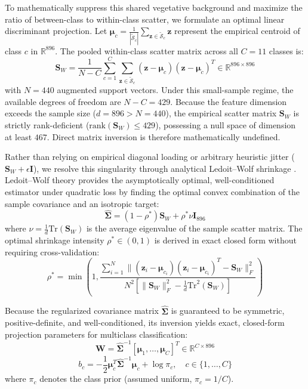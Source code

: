\documentclass[conference]{IEEEtran}
\begin{document}
To mathematically suppress this shared vegetative background and maximize the ratio of between-class to within-class scatter, we formulate an optimal linear discriminant projection. Let $\boldsymbol{\mu}_c = \frac{1}{|\tilde{\mathcal{S}}_c|}\sum_{\mathbf{z} \in \tilde{\mathcal{S}}_c} \mathbf{z}$ represent the empirical centroid of class $c$ in $\mathbb{R}^{896}$. The pooled within-class scatter matrix across all $C=11$ classes is:
\begin{equation}
\mathbf{S}_W = \frac{1}{N - C}\sum_{c=1}^C \sum_{\mathbf{z} \in \tilde{\mathcal{S}}_c} (\mathbf{z} - \boldsymbol{\mu}_c)(\mathbf{z} - \boldsymbol{\mu}_c)^T \in \mathbb{R}^{896 \times 896}
\end{equation}
with $N = 440$ augmented support vectors. Under this small-sample regime, the available degrees of freedom are $N - C = 429$. Because the feature dimension exceeds the sample size ($d = 896 > N = 440$), the empirical scatter matrix $\mathbf{S}_W$ is strictly rank-deficient ($\text{rank}(\mathbf{S}_W) \le 429$), possessing a null space of dimension at least $467$. Direct matrix inversion is therefore mathematically undefined.

Rather than relying on empirical diagonal loading or arbitrary heuristic jitter ($\mathbf{S}_W + \epsilon \mathbf{I}$), we resolve this singularity through analytical Ledoit--Wolf shrinkage \cite{ledoit2004well}. Ledoit--Wolf theory provides the asymptotically optimal, well-conditioned estimator under quadratic loss by finding the optimal convex combination of the sample covariance and an isotropic target:
\begin{equation}
\hat{\mathbf{\Sigma}} = (1 - \rho^*)\mathbf{S}_W + \rho^* \nu \mathbf{I}_{896}
\end{equation}
where $\nu = \frac{1}{d}\text{Tr}(\mathbf{S}_W)$ is the average eigenvalue of the sample scatter matrix. The optimal shrinkage intensity $\rho^* \in (0, 1)$ is derived in exact closed form without requiring cross-validation:
\begin{equation}
\rho^* = \min\left(1, \frac{\sum_{i=1}^N \|(\mathbf{z}_i - \boldsymbol{\mu}_{c_i})(\mathbf{z}_i - \boldsymbol{\mu}_{c_i})^T - \mathbf{S}_W\|_F^2}{N^2 \left[\|\mathbf{S}_W\|_F^2 - \frac{1}{d}\text{Tr}^2(\mathbf{S}_W)\right]}\right)
\end{equation}

Because the regularized covariance matrix $\hat{\mathbf{\Sigma}}$ is guaranteed to be symmetric, positive-definite, and well-conditioned, its inversion yields exact, closed-form projection parameters for multiclass classification:
\begin{equation}
\mathbf{W} = \hat{\mathbf{\Sigma}}^{-1} [\boldsymbol{\mu}_1, \dots, \boldsymbol{\mu}_C]^T \in \mathbb{R}^{C \times 896}
\end{equation}
\begin{equation}
b_c = -\frac{1}{2} \boldsymbol{\mu}_c^T \hat{\mathbf{\Sigma}}^{-1} \boldsymbol{\mu}_c + \log \pi_c, \quad c \in \{1, \dots, C\}
\end{equation}
where $\pi_c$ denotes the class prior (assumed uniform, $\pi_c = 1/C$). 
\end{document}
